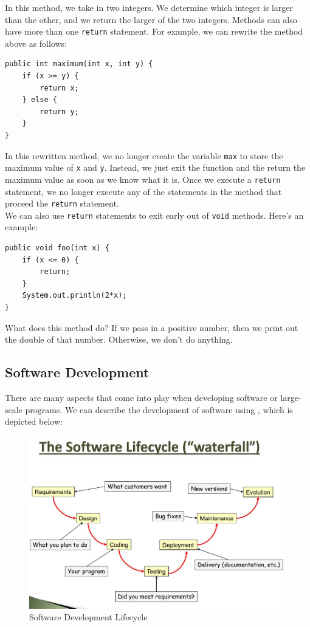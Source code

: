 In this method, we take in two integers. We determine which integer is larger than the other, and we return the larger of the two integers. Methods can also have more than one \verb!return! statement. For example, we can rewrite the method above as follows:

\begin{lstlisting}
public int maximum(int x, int y) {
    if (x >= y) {
        return x;
    } else {
        return y;
    }
}
\end{lstlisting}

In this rewritten method, we no longer create the variable \verb!max! to store the maximum value of \verb!x! and \verb!y!. Instead, we just exit the function and the return the maximum value as soon as we know what it is. Once we execute a \verb!return! statement, we no longer execute any of the statements in the method that proceed the \verb!return! statement. \\


We can also use \verb!return! statements to exit early out of \verb!void! methods. Here's an example:

\begin{lstlisting}
public void foo(int x) {
    if (x <= 0) {
        return;
    }
    System.out.println(2*x);
}
\end{lstlisting}

What does this method do? If we pass in a positive number, then we print out the double of that number. Otherwise, we don't do anything. 


\subsection{Software Development}

There are many aspects that come into play when developing software or large-scale programs. We can describe the development of software using , which is depicted below:


\begin{figure}[h]
    \centering
    \includegraphics[scale=0.6]{media/lifecycle}
    \caption{Software Development Lifecycle}
    \label{fig:my_label}
\end{figure}

